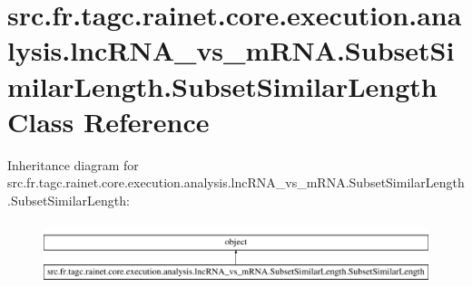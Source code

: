 \hypertarget{classsrc_1_1fr_1_1tagc_1_1rainet_1_1core_1_1execution_1_1analysis_1_1lncRNA__vs__mRNA_1_1SubsetS533a3a1e4aeb7ed6941cfae512e8909f}{\section{src.\-fr.\-tagc.\-rainet.\-core.\-execution.\-analysis.\-lnc\-R\-N\-A\-\_\-vs\-\_\-m\-R\-N\-A.\-Subset\-Similar\-Length.\-Subset\-Similar\-Length Class Reference}
\label{classsrc_1_1fr_1_1tagc_1_1rainet_1_1core_1_1execution_1_1analysis_1_1lncRNA__vs__mRNA_1_1SubsetS533a3a1e4aeb7ed6941cfae512e8909f}
}
Inheritance diagram for src.\-fr.\-tagc.\-rainet.\-core.\-execution.\-analysis.\-lnc\-R\-N\-A\-\_\-vs\-\_\-m\-R\-N\-A.\-Subset\-Similar\-Length.\-Subset\-Similar\-Length\-:\begin{figure}[H]
\begin{center}
\leavevmode
\includegraphics[height=1.872910cm]{classsrc_1_1fr_1_1tagc_1_1rainet_1_1core_1_1execution_1_1analysis_1_1lncRNA__vs__mRNA_1_1SubsetS533a3a1e4aeb7ed6941cfae512e8909f}
\end{center}
\end{figure}
